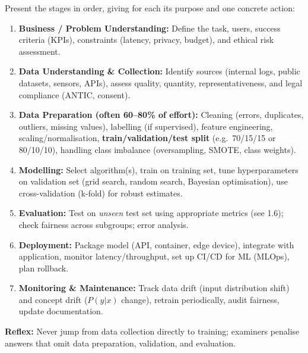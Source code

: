 \documentclass[11pt]{article}
\newcounter{popsec}
\newcounter{popsub}
\newcommand{\courssub}[1]{%
  \stepcounter{popsub}%
  \par\vspace{9pt}\noindent{\popxbold\fontsize{11.5}{13}\selectfont\color{popink}{\color{poporange}\thepopsec.\thepopsub}\hspace{6pt}#1}\par\nopagebreak\vspace{4pt}
}
\begin{document}
\courssub{Developing AI Systems}

\begin{methode}
Present the stages in order, giving for each its purpose and one concrete action:
\begin{enumerate}
\item \textbf{Business / Problem Understanding:} Define the task, users, success criteria (KPIs), constraints (latency, privacy, budget), and ethical risk assessment.
\item \textbf{Data Understanding \& Collection:} Identify sources (internal logs, public datasets, sensors, APIs), assess quality, quantity, representativeness, and legal compliance (ANTIC, consent).
\item \textbf{Data Preparation (often 60–80\% of effort):} Cleaning (errors, duplicates, outliers, missing values), labelling (if supervised), feature engineering, scaling/normalisation, \textbf{train/validation/test split} (e.g.\ 70/15/15 or 80/10/10), handling class imbalance (oversampling, SMOTE, class weights).
\item \textbf{Modelling:} Select algorithm(s), train on training set, tune hyperparameters on validation set (grid search, random search, Bayesian optimisation), use cross-validation (k-fold) for robust estimates.
\item \textbf{Evaluation:} Test on \emph{unseen} test set using appropriate metrics (see 1.6); check fairness across subgroups; error analysis.
\item \textbf{Deployment:} Package model (API, container, edge device), integrate with application, monitor latency/throughput, set up CI/CD for ML (MLOps), plan rollback.
\item \textbf{Monitoring \& Maintenance:} Track data drift (input distribution shift) and concept drift ($P(y|x)$ change), retrain periodically, audit fairness, update documentation.
\end{enumerate}
\textbf{Reflex:} Never jump from data collection directly to training; examiners penalise answers that omit data preparation, validation, and evaluation.
\end{methode}
\end{document}

